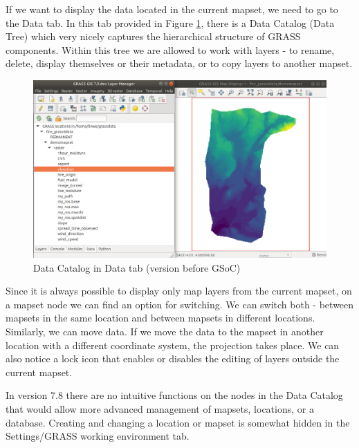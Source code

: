 \documentclass[a4paper,10pt,twoside]{article}
\begin{document}
If we want to display the data located in the current mapset, we need to go to the Data tab. In this tab provided in Figure 
\ref{fig:data_catalog_pred}, there is a Data Catalog (Data Tree) which very nicely captures the hierarchical structure of GRASS components. Within this tree we are allowed to work with layers - to rename, delete, display themselves or their metadata, or to copy layers to another mapset.

\vspace{0.3cm}
\begin{figure}[hbt!] 
\begin{center}
\includegraphics[width=15cm]{pictures/data_catalog_pred.png} 
\caption[Data Catalog in Data tab (version before GSoC)]{Data Catalog in Data tab (version before GSoC)}
\label{fig:data_catalog_pred}
\end{center}
\end{figure}

Since it is always possible to display only map layers from the current mapset, on a mapset node we can find an option for switching. We can switch both - between mapsets in the same location and between mapsets in different locations. Similarly, we can move data. If we move the data to the mapset in another location with a different coordinate system, the projection takes place. We can also notice a lock icon that enables or disables the editing of layers outside the current mapset.

In version 7.8 there are no intuitive functions on the nodes in the Data Catalog that would allow more advanced management of mapsets, locations, or a database. Creating and changing a location or mapset is somewhat hidden in the Settings/GRASS working environment tab.


\newpage
\vspace*{-1cm}
\end{document}
